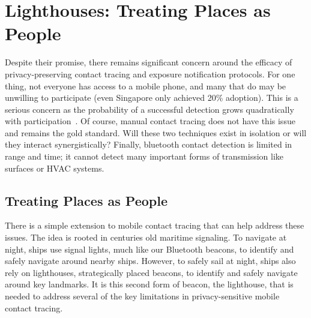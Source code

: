 \section{Lighthouses: Treating Places as People}


Despite their promise, there remains significant concern around the efficacy of privacy-preserving contact tracing and exposure notification protocols.
For one thing, not everyone has access to a mobile phone, and many that do may be unwilling to participate (even Singapore only achieved 20\% adoption\cite{traceTogether20pct}). 
This is a serious concern as the probability of a successful detection grows quadratically with participation~\cite{pact}. 
Of course, manual contact tracing does not have this issue and remains the gold standard. 
Will these two techniques exist in isolation or will they interact synergistically? 
Finally, bluetooth contact detection is limited in range and time; it cannot detect many important forms of transmission like surfaces or HVAC systems\cite{hvacTransmission}.

\subsection{Treating Places as People}
There is a simple extension to mobile contact tracing that can help address these issues. 
The idea is rooted in centuries old maritime signaling. To navigate at night, ships use signal lights, much like our Bluetooth beacons, to identify and safely navigate around nearby ships. 
However, to safely sail at night, ships also rely on lighthouses, strategically placed beacons, to identify and safely navigate around key landmarks. 
It is this second form of beacon, the lighthouse, that is needed to address several of the key limitations in privacy-sensitive mobile contact tracing.

